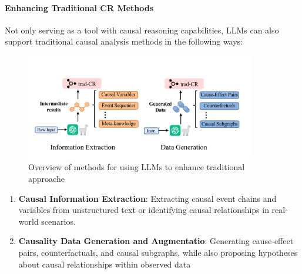 \paragraph{Enhancing Traditional CR Methods} Not only serving as a tool with causal reasoning capabilities, LLMs can also support traditional causal analysis methods in the following ways:

\begin{figure}
    \centering
    \includegraphics[width=0.9\textwidth]{Figs/causal_trandition_imprv.png}
    \caption{Overview of methods for using LLMs to enhance traditional approache}
    \label{fig:causal_tradition}
\end{figure}

\begin{enumerate}
    \item \textbf{Causal Information Extraction}: Extracting causal event chains and variables from unstructured text or identifying causal relationships in real-world scenarios.
    \item \textbf{Causality Data Generation and Augmentatio}: Generating cause-effect pairs, counterfactuals, and causal subgraphs, while also proposing hypotheses about causal relationships within observed data
\end{enumerate}